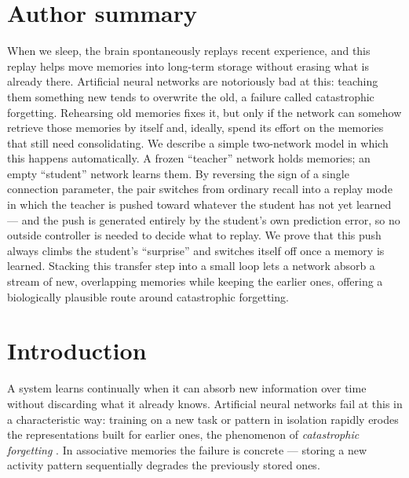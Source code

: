 \documentclass[10pt,letterpaper]{article}
\theoremstyle{plain}
\theoremstyle{remark}
\begin{document}
\section*{Author summary}
When we sleep, the brain spontaneously replays recent experience, and this replay helps move memories
into long-term storage without erasing what is already there. Artificial neural networks are notoriously
bad at this: teaching them something new tends to overwrite the old, a failure called catastrophic
forgetting. Rehearsing old memories fixes it, but only if the network can somehow retrieve those
memories by itself and, ideally, spend its effort on the memories that still need consolidating. We
describe a simple two-network model in which this happens automatically. A frozen ``teacher'' network
holds memories; an empty ``student'' network learns them. By reversing the sign of a single connection
parameter, the pair switches from ordinary recall into a replay mode in which the teacher is pushed
toward whatever the student has not yet learned --- and the push is generated entirely by the student's
own prediction error, so no outside controller is needed to decide what to replay. We prove that this
push always climbs the student's ``surprise'' and switches itself off once a memory is learned. Stacking
this transfer step into a small loop lets a network absorb a stream of new, overlapping memories while
keeping the earlier ones, offering a biologically plausible route around catastrophic forgetting.

\linenumbers
\newpage

\section{Introduction}
A system learns continually when it can absorb new information over time without discarding what it
already knows. Artificial neural networks fail at this in a characteristic way: training on a new task
or pattern in isolation rapidly erodes the representations built for earlier ones, the phenomenon of
\emph{catastrophic forgetting} \cite{mccloskey1989catastrophic,robins1995catastrophic,kirkpatrick2017ewc}.
In associative memories the failure is concrete --- storing a new activity pattern sequentially degrades
the previously stored ones.
\end{document}
